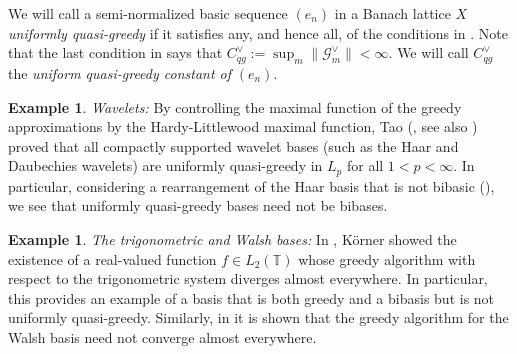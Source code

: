 \documentclass[12pt,leqno]{amsart}
\numberwithin{equation}{section}
\theoremstyle{definition}
\newtheorem{example}[theorem]{Example}
\newcommand{\term}[1]{{\textit{#1}}}   %
\begin{document}
We will call a semi-normalized basic sequence $(e_n)$ in a Banach lattice $X$ \emph{uniformly quasi-greedy} if it satisfies any, and hence all, of the conditions in . Note that the last condition in    says that $C_{qg}^\vee:=\sup_m\|\mathcal{G}_m^\vee\|<\infty$.  We will call $C_{qg}^\vee$ the \term{uniform quasi-greedy constant of} $(e_n)$. 

\begin{example}\textit{Wavelets:}
By controlling the maximal function of the greedy approximations by the Hardy-Littlewood maximal function, Tao (\cite{Tao96}, see also \cite{KO97})  proved that  all compactly supported wavelet bases (such as the Haar and Daubechies wavelets) are uniformly quasi-greedy in $L_p$ for all $1<p<\infty$. In particular, considering a rearrangement of the Haar basis that is not bibasic (\cite[Example 6.2]{TT19}), we see that uniformly quasi-greedy bases need not be bibases.
\end{example}
\begin{example}\textit{The trigonometric and Walsh bases:} In \cite{K96}, K\"orner showed  the existence of a real-valued function $f\in L_2(\mathbb{T})$ whose greedy algorithm with respect to the trigonometric system diverges almost everywhere. In particular, this provides an example of a basis that is both greedy and a bibasis but is not uniformly quasi-greedy. Similarly, in \cite{K06} it is shown that the greedy algorithm for the Walsh basis need not converge almost everywhere. %
\end{example}
\end{document}
